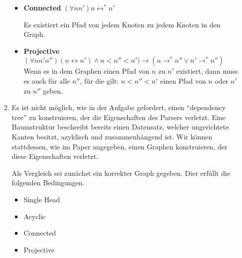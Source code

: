 \documentclass[a4paper]{scrartcl}
\begin{document}
\begin{enumerate}
\begin{enumerate}[label=(\alph*)]
{\begin{itemize}
            \item {\textbf{Connected}    $(\forall n n') n \leftrightarrow^\ast n'$
            
            Es existiert ein Pfad von jedem Knoten zu jedem Knoten in den Graph.
	        }
            
            \item  {\textbf{Projective} $(\forall n n' n'') (n \leftrightarrow n') \land n < n'' < n') \rightarrow (n \rightarrow^\ast n'' \lor n' \rightarrow^\ast n'')$
	        Wenn es in dem Graphen einen Pfad von $n$ zu $n'$ existiert, dann muss es auch für alle
			$n''$, für die gilt: $n < n'' < n'$ einen Pfad von $n$ oder $n'$ zu $n''$ geben.
	        }
		    \end{itemize}
	        }
            
            \item
            Es ist nicht möglich, wie in der Aufgabe gefordert, einen "`dependency tree"' zu konstruieren, der die Eigenschaften des Parsers verletzt. Eine Baumstruktur beschreibt bereits einen Datensatz, welcher ungerichtete Kanten besitzt, azyklisch und zusammenhängend ist. Wir können stattdessen, wie im Paper angegeben, einen Graphen konstruieren, der diese Eigenschaften verletzt.
            
            Als Vergleich sei zunächst ein korrekter Graph gegeben. Dier erfüllt die folgenden Bedingungen.
            
            \begin{itemize}
            	\item Single Head
            	\item Acyclic
            	\item Connected
            	\item Projective
            \end{itemize}
            
\begin{figure}[H]
	\centering

\end{figure}
\end{enumerate}
\end{enumerate}
\end{document}

